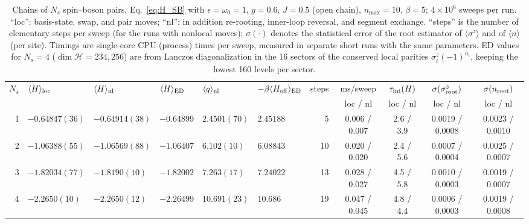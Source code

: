 \begin{table}[t]
\caption{Chains of $N_s$ spin--boson pairs, Eq.~\eqref{eq:H_SB} with $\epsilon=\omega_0=1$, $g=0.6$, $J=0.5$ (open chain), $n_{\max}=10$, $\beta=5$; $4\times10^6$ sweeps per run. ``loc'': basis-state, swap, and pair moves; ``nl'': in addition re-rooting, inner-loop reversal, and segment exchange. ``steps'' is the number of elementary steps per sweep (for the runs with nonlocal moves); $\sigma(\cdot)$ denotes the statistical error of the root estimator of $\langle\sigma^z\rangle$ and of $\langle n\rangle$ (per site). Timings are single-core CPU (process) times per sweep, measured in separate short runs with the same parameters. ED values for $N_s=4$ ($\dim\mathcal H=234{,}256$) are from Lanczos diagonalization in the 16 sectors of the conserved local parities $\sigma^z_i(-1)^{n_i}$, keeping the lowest 160 levels per sector.}
\label{tab:scaling}
\footnotesize
\begin{tabular}{r|lll|ll|r|c|c|c|c}
\hline\hline
$N_s$ & $\langle H\rangle_{\rm loc}$ & $\langle H\rangle_{\rm nl}$ & $\langle H\rangle_{\rm ED}$ & $\langle q\rangle_{\rm nl}$ & $-\beta\langle H_{\rm off}\rangle_{\rm ED}$ & steps & ms/sweep & $\tau_{\rm int}(H)$ & $\sigma(\sigma^z_{\rm root})$ & $\sigma(n_{\rm root})$\\
 & & & & & & & loc / nl & loc / nl & loc / nl & loc / nl\\
\hline
1 & $-0.64847(36)$ & $-0.64914(38)$ & $-0.64899$ & $2.4501(70)$ & $2.45188$ & 5 & 0.006 / 0.007 & 2.6 / 3.9 & 0.0019 / 0.0008 & 0.0023 / 0.0010\\
2 & $-1.06388(55)$ & $-1.06569(88)$ & $-1.06407$ & $6.102(10)$ & $6.08843$ & 10 & 0.020 / 0.020 & 2.4 / 5.6 & 0.0007 / 0.0004 & 0.0025 / 0.0007\\
3 & $-1.82034(77)$ & $-1.8190(10)$ & $-1.82002$ & $7.263(17)$ & $7.24022$ & 13 & 0.028 / 0.027 & 4.5 / 5.8 & 0.0010 / 0.0003 & 0.0019 / 0.0007\\
4 & $-2.2650(10)$ & $-2.2650(12)$ & $-2.26499$ & $10.691(23)$ & $10.686$ & 19 & 0.047 / 0.045 & 4.8 / 4.4 & 0.0006 / 0.0003 & 0.0019 / 0.0008\\
\hline\hline
\end{tabular}
\end{table}
